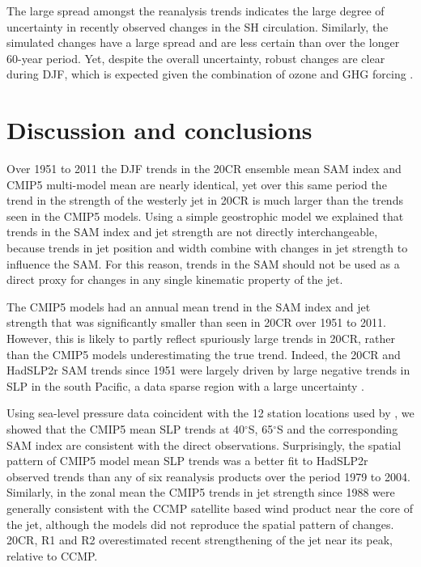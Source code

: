 \documentclass{ametsoc}
\begin{document}
The large spread amongst the reanalysis trends indicates the large degree of uncertainty in 
recently observed changes in the SH circulation. Similarly, the simulated changes have a 
large spread and are less certain than over the longer 60-year period. Yet, despite the overall 
uncertainty, robust changes are clear during DJF, which is expected given the combination
of ozone and GHG forcing \citep{Son_et_al_2010}. 

\section{Discussion and conclusions} \label{sec:conclusions}
Over 1951 to 2011 the DJF trends in the 20CR ensemble mean SAM index and CMIP5 multi-model 
mean are nearly identical, yet over this same period the trend in the strength of the westerly jet in
20CR is much larger than the trends seen in the CMIP5 models. Using a simple geostrophic
model we explained that trends in the SAM index and jet strength are not directly
interchangeable, because trends in jet position and width combine with changes in jet strength
to influence the SAM. For this reason, trends in the SAM should not be used as a direct
proxy for changes in any single kinematic property of the jet.

The CMIP5 models had an annual mean trend in the SAM index and jet strength
that was significantly smaller than seen in 20CR over 1951 to 2011. However, 
this is likely to partly reflect spuriously large trends in 20CR, rather than 
the CMIP5 models underestimating the true trend. Indeed, the 20CR and 
HadSLP2r SAM trends since 1951 were largely driven by 
large negative trends in SLP in the south Pacific, a data sparse region
with a large uncertainty \citep[Fig. \ref{fig:20CR_uncertainty_map};][]{Allan_and_Ansell_2006}. 

Using sea-level pressure data coincident with the 12 station locations used
by \citet {Marshall_2003}, we showed that the CMIP5 mean SLP trends 
at 40$^{\circ}$S, 65$^{\circ}$S 
and the corresponding SAM index are consistent with the direct
observations. Surprisingly, the spatial pattern of
CMIP5 model mean SLP trends was a better fit to HadSLP2r observed trends than any of six 
reanalysis products over the period 1979 to 2004. Similarly, in the zonal mean
the CMIP5 trends in jet strength since 1988 were generally consistent with the 
CCMP satellite based wind product near the core of the jet, although the models
did not reproduce the spatial pattern of changes. 20CR, R1 and R2 overestimated 
recent strengthening of the jet near its peak, relative to CCMP. 
\end{document}
